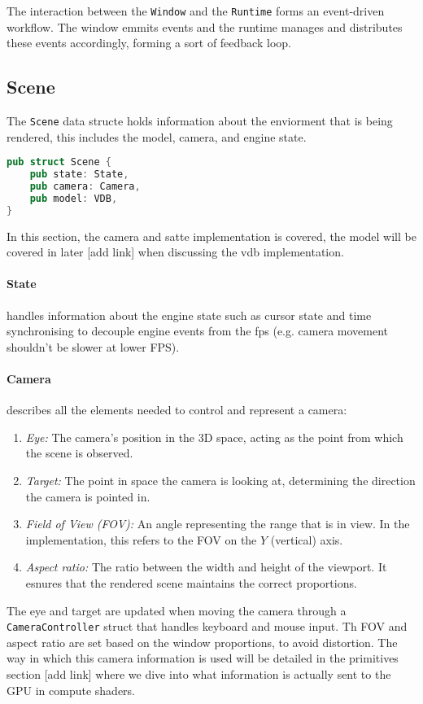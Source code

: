 The interaction between the \verb|Window| and the \verb|Runtime| forms an event-driven workflow. The window emmits events and the runtime manages and distributes these events accordingly, forming a sort of feedback loop.

\subsection{Scene}\label{scene:def}
The \verb|Scene| data structe holds information about the enviorment that is being rendered, this includes the model, camera, and engine state.

\begin{lstlisting}[language=rust,caption={Scene definition},captionpos=b]
pub struct Scene {
    pub state: State,
    pub camera: Camera,
    pub model: VDB,
}
\end{lstlisting}

In this section, the camera and satte implementation is covered, the model will be covered in later [add link] when discussing the \acrshort{vdb} implementation.

\paragraph{State} handles information about the engine state such as cursor state and time synchronising to decouple engine events from the \acrshort{fps} (e.g. camera movement shouldn't be slower at lower FPS).

\paragraph{Camera} describes all the elements needed to control and represent a camera:
\begin{enumerate}
    \item \emph{Eye:} The camera's position in the 3D space, acting as the point from which the scene is observed.
    \item \emph{Target:} The point in space the camera is looking at, determining the direction the camera is pointed in.
    \item \emph{Field of View (FOV):} An angle representing the range that is in view. In the implementation, this refers to the FOV on the $Y$ (vertical) axis.\label{fov:def}
    \item \emph{Aspect ratio:} The ratio between the width and height of the viewport. It esnures that the rendered scene maintains the correct proportions.
\end{enumerate}
The eye and target are updated when moving the camera through a \verb|CameraController| struct that handles keyboard and mouse input. Th FOV and aspect ratio are set based on the window proportions, to avoid distortion. The way in which this camera information is used will be detailed in the primitives section [add link] where we dive into what information is actually sent to the GPU in compute shaders.


